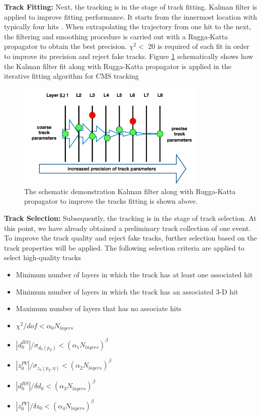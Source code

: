 \textbf{Track Fitting:} Next, the tracking is in the stage of track fitting. Kalman filter \cite{Kalman} is applied to improve fitting performance. It starts from the innermost location with typically four hits \cite{CMSTrack1,CMSTrack2,CMSTrack3}. When extrapolating the trajectory from one hit to the next, the filtering and smoothing procedure is carried out with a Rugga-Katta propagator to obtain the best precision. $\chi^2 < $ 20 is required of each fit in order to improve its precision and reject fake tracks. Figure \ref{KalmanFitting} schematically shows how the Kalman filter fit along with Rugga-Katta propagator is applied in the iterative fitting algorithm for CMS tracking


\begin{figure}[hbtp]
\begin{center}
\includegraphics[width=0.80\textwidth]{Figures/Chapter4/KalmanFitting.png}
\caption{The schematic demonstration Kalman filter along with Rugga-Katta propagator to improve the tracks fitting is shown above.}
\label{KalmanFitting}
\end{center}
\end{figure} 


\textbf{Track Selection:} Subsequently, the tracking is in the stage of track selection. At this point, we have already obtained a preliminary track collection of one event. To improve the track quality and reject fake tracks, further selection based on the track properties will be applied. The following selection criteria are applied to select high-quality tracks \cite{CMSTrackComp}

\begin{itemize}
\item Minimum number of layers in which the track has at least one associated hit
\item Minimum number of layers in which the track has an associated 3-D hit
\item Maximum number of layers that has no associate hits
\item $\chi^2/dof < \alpha_0 N_{layers}$ 
\item $|d_0^{BS}|/ \sigma_{d_0(p_T)} < (\alpha_1 N_{layers})^\beta$ 
\item $|z_0^{PV}|/ \sigma_{z_0(p_T,\eta)}  < (\alpha_2 N_{layers})^\beta$ 
\item $|d_0^{BS}|/\delta d_0 < (\alpha_3 N_{layers})^\beta$ 
\item $|z_0^{PV}|/\delta z_0 < (\alpha_4 N_{layers})^\beta$ 
\end{itemize}

